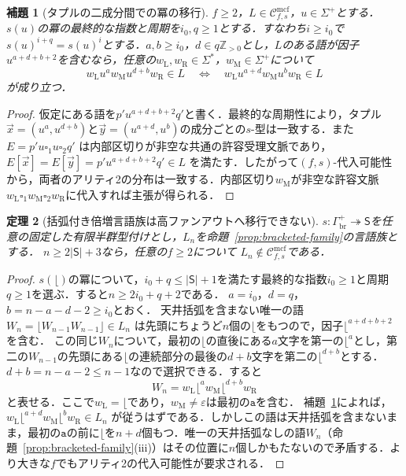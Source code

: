 \documentclass[11pt,a4paper]{ltjsarticle}
\numberwithin{equation}{section}
\theoremstyle{plain}
\newtheorem{theorem}{定理}[section]
\newtheorem{lemma}[theorem]{補題}
\theoremstyle{definition}
\theoremstyle{remark}
\newcommand{\Cmcf}[2]{\mathcal{C}^{\mathrm{mcf}}_{#1,#2}}
\newcommand{\tuple}[1]{\vec{#1}}
\newcommand{\blank}{\square}
\newcommand{\eps}{\varepsilon}
\begin{document}
\begin{lemma}[タプルの二成分間での冪の移行]
\label{lem:power-transfer}
$f\ge2$，$L\in\Cmcf{f}{s}$，$u\in\Sigma^+$とする．$s(u)$の冪の最終的な指数と周期を$i_0,q\ge1$とする．すなわち$i\ge i_0$で$s(u)^{i+q}=s(u)^i$とする．$a,b\ge i_0$，$d\in q\mathbb Z_{>0}$とし，$L$のある語が因子$u^{a+d+b+2}$を含むなら，任意の$w_{\mathrm L},w_{\mathrm R}\in\Sigma^*$，$w_{\mathrm M}\in\Sigma^+$について
\[
 w_{\mathrm L}u^aw_{\mathrm M}u^{d+b}w_{\mathrm R}\in L
 \quad\Longleftrightarrow\quad
 w_{\mathrm L}u^{a+d}w_{\mathrm M}u^bw_{\mathrm R}\in L
\]
が成り立つ．
\end{lemma}
\begin{proof}
仮定にある語を$p'u^{a+d+b+2}q'$と書く．最終的な周期性により，タプル
$\tuple x=(u^a,u^{d+b})$と$\tuple y=(u^{a+d},u^b)$の成分ごとの$s$-型は一致する．また
$E=p'u\blank_1u\blank_2q'$
は内部区切りが非空な共通の許容受理文脈であり，
$E[\tuple x]=E[\tuple y]=p'u^{a+d+b+2}q'\in L$
を満たす．したがって$(f,s)$-代入可能性から，両者のアリティ2の分布は一致する．内部区切り$w_{\mathrm M}$が非空な許容文脈$w_{\mathrm L}\blank_1w_{\mathrm M}\blank_2w_{\mathrm R}$に代入すれば主張が得られる．
\end{proof}

\begin{theorem}[括弧付き倍増言語族は高ファンアウトへ移行できない]
\label{thm:doubling-no-lift}
$s:\Gamma_{\mathrm{br}}^+\twoheadrightarrow\mathsf S$を任意の固定した有限半群型付けとし，$L_n$を命題~\ref{prop:bracketed-family}の言語族とする．
$n\ge2|\mathsf S|+3$なら，任意の$f\ge2$について
$L_n\notin\Cmcf{f}{s}$である．
\end{theorem}
\begin{proof}
$s(\lfloor)$の冪について，$i_0+q\le|\mathsf S|+1$を満たす最終的な指数$i_0\ge1$と周期$q\ge1$を選ぶ．すると$n\ge2i_0+q+2$である．
$a=i_0$，$d=q$，$b=n-a-d-2\ge i_0$とおく．
天井括弧を含まない唯一の語
$W_n=\lfloor W_{n-1}W_{n-1}\rfloor\in L_n$
は先頭にちょうど$n$個の$\lfloor$をもつので，因子$\lfloor^{a+d+b+2}$を含む．
この同じ$W_n$について，最初の$\lfloor$の直後にある$a$文字を第一の$\lfloor^a$とし，第二の$W_{n-1}$の先頭にある$\lfloor$の連続部分の最後の$d+b$文字を第二の$\lfloor^{d+b}$とする．$d+b=n-a-2\le n-1$なので選択できる．すると
\[
 W_n=w_{\mathrm L}\lfloor^aw_{\mathrm M}\lfloor^{d+b}w_{\mathrm R}
\]
と表せる．ここで$w_{\mathrm L}=\lfloor$であり，$w_{\mathrm M}\ne\eps$は最初の$\mathtt a$を含む．
補題~\ref{lem:power-transfer}によれば，
$w_{\mathrm L}\lfloor^{a+d}w_{\mathrm M}\lfloor^bw_{\mathrm R}\in L_n$
が従うはずである．しかしこの語は天井括弧を含まないまま，最初の$\mathtt a$の前に$\lfloor$を$n+d$個もつ．唯一の天井括弧なしの語$W_n$（命題~\ref{prop:bracketed-family}(iii)）はその位置に$n$個しかもたないので矛盾する．より大きな$f$でもアリティ2の代入可能性が要求される．
\end{proof}
\end{document}

